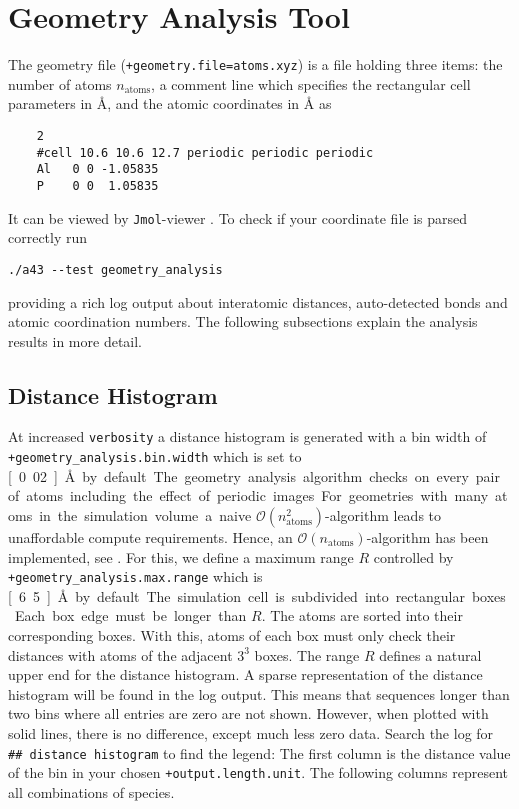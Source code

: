 \documentclass[oribibl]{llncs}
\newcommand{\um}[1]{_{\mathrm{#1}}}
\newcommand{\ttt}[1]{\texttt{#1}}
\begin{document}
\section{Geometry Analysis Tool} \label{sec:geometry-analysis}
%
The geometry file (\ttt{+geometry.file=atoms.xyz}) is a file
holding three items:
the number of atoms $n\um{atoms}$, 
a comment line which specifies the rectangular cell parameters in \AA{}, 
and the atomic coordinates in \AA{} as
\begin{verbatim}
    2
    #cell 10.6 10.6 12.7 periodic periodic periodic
    Al   0 0 -1.05835
    P    0 0  1.05835
\end{verbatim}
It can be viewed by \ttt{Jmol}-viewer \cite{jmol-software}.
%
\noindent
To check if your coordinate file is parsed correctly run
\begin{verbatim}
./a43 --test geometry_analysis
\end{verbatim}
providing a rich log output about interatomic distances,
auto-detected bonds and atomic coordination numbers.
The following subsections explain the analysis results in more detail.

\subsection{Distance Histogram} \label{sec:distance-histogram}
%
At increased \ttt{verbosity} a distance histogram is generated with
a bin width of \ttt{+geometry\_analysis.bin.width} which is set to \unit[0.02]{\AA} by default.
The geometry analysis algorithm checks on every pair of atoms
including the effect of periodic images.
For geometries with many atoms in the simulation volume
a naive $\mathcal O(n\um{atoms}^2)$-algorithm 
leads to unaffordable compute requirements.
Hence, an $\mathcal O(n\um{atoms})$-algorithm has been implemented, see \cite{a43theory}.
For this, we define a maximum range $R$ controlled 
by \ttt{+geometry\_analysis.max.range} which is \unit[6.5]{\AA} by default.
The simulation cell is subdivided into rectangular boxes. 
Each box edge must be longer than $R$. 
The atoms are sorted into their corresponding boxes.
With this, atoms of each box must only check their distances 
with atoms of the adjacent $3^3$ boxes.
The range $R$ defines a natural upper end for the distance histogram.
A sparse representation of the distance histogram will be found in the log output.
This means that sequences longer than two bins where all entries are zero are not shown.
However, when plotted with solid lines, there is no difference, except much less zero data.
Search the log for \ttt{\#\# distance histogram} to find the legend:
The first column is the distance value of the bin in your chosen \ttt{+output.length.unit}.
The following columns represent all combinations of species.
\end{document}

